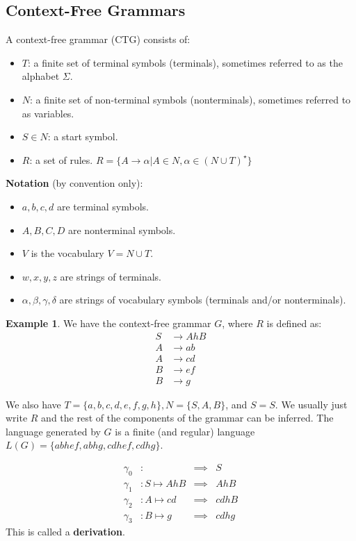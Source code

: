 \documentclass[]{article}
\theoremstyle{definition}
\newtheorem{ex}{Example}[section]
\begin{document}
		\subsection{Context-Free Grammars}
			A context-free grammar (CTG) consists of:
			\begin{itemize}
				\item $T$: a finite set of terminal symbols (terminals), sometimes referred to as the alphabet $\Sigma$.
				\item $N$: a finite set of non-terminal symbols (nonterminals), sometimes referred to as variables.
				\item $S \in N$: a start symbol.
				\item $R$: a set of rules. $R = \{A \to \alpha | A \in N, \alpha \in (N \cup T)^\star\}$
			\end{itemize}

			\textbf{Notation} (by convention only):
			\begin{itemize}
				\item $a, b, c, d$ are terminal symbols.
				\item $A, B, C, D$ are nonterminal symbols.
				\item $V$ is the vocabulary $V = N \cup T$.
				\item $w, x, y, z$ are strings of terminals.
				\item $\alpha, \beta, \gamma, \delta$ are strings of vocabulary symbols (terminals and/or nonterminals).
			\end{itemize}

			\begin{ex}
				We have the context-free grammar $G$, where $R$ is defined as:
				\begin{align*}
					S &\to AhB \\
					A &\to ab \\
					A &\to cd \\
					B &\to ef \\
					B &\to g
				\end{align*}

				We also have $T = \{a, b, c, d, e, f, g, h\}, N = \{S, A, B\}$, and $S = S$. We usually just write $R$ and the rest of the components of the grammar can be inferred. The language generated by $G$ is a finite (and regular) language $L(G) = \{abhef, abhg, cdhef, cdhg\}$.

				\begin{align*}
					\gamma_0&: &\implies& S \\
					\gamma_1&: S \mapsto AhB &\implies& AhB \\
					\gamma_2&: A \mapsto cd &\implies& cdhB \\
					\gamma_3&: B \mapsto g &\implies& cdhg
				\end{align*}
				This is called a \textbf{derivation}.
			\end{ex}
\end{document}
